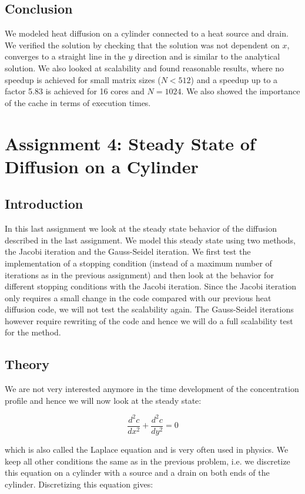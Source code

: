 \documentclass[11pt,a4paper,onecolumn]{article}
\begin{document}
\subsection{Conclusion}
We modeled heat diffusion on a cylinder connected to a heat source and drain. We verified the solution by checking that the solution was not dependent on $x$, converges to a straight line in the $y$ direction and is similar to the analytical solution. We also looked at scalability and found reasonable results, where no speedup is achieved for small matrix sizes ($N<512$) and a speedup up to a factor 5.83 is achieved for 16 cores and $N = 1024$. We also showed the importance of the cache in terms of execution times.

\newpage 

\section{Assignment 4: Steady State of Diffusion on a Cylinder}
\subsection{Introduction}
In this last assignment we look at the steady state behavior of the diffusion described in the last assignment. We model this steady state using two methods, the Jacobi iteration and the Gauss-Seidel iteration. We first test the implementation of a stopping condition (instead of a maximum number of iterations as in the previous assignment) and then look at the behavior for different stopping conditions with the Jacobi iteration. Since the Jacobi iteration only requires a small change in the code compared with our previous heat diffusion code, we will not test the scalability again. The Gauss-Seidel iterations however require rewriting of the code and hence we will do a full scalability test for the method.

\subsection{Theory}
We are not very interested anymore in the time development of the concentration profile and hence we will now look at the steady state:

\begin{equation}
  \frac{d^2c}{dx^2} + \frac{d^2c}{dy^2} = 0
\end{equation}

which is also called the Laplace equation and is very often used in physics. We keep all other conditions the same as in the previous problem, i.e. we discretize this equation on a cylinder with a source and a drain on both ends of the cylinder. Discretizing this equation gives:
\end{document}
